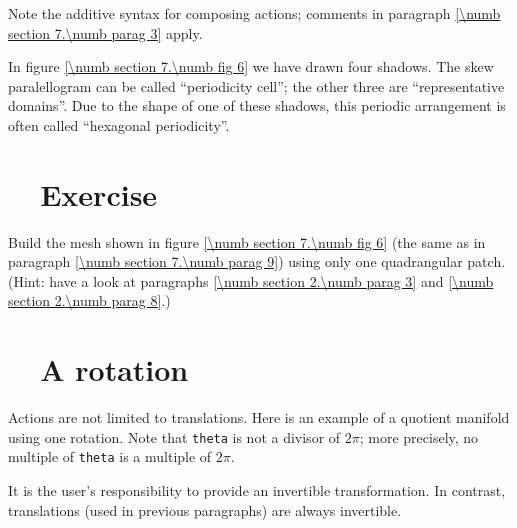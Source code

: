 Note the additive syntax for composing actions; comments in paragraph
\ref{\numb section 7.\numb parag 3} apply.

In figure \ref{\numb section 7.\numb fig 6} we have drawn four shadows.
The skew paralellogram can be called ``periodicity cell'';
the other three are ``representative domains''.
Due to the shape of one of these shadows, this periodic arrangement is often called
``hexagonal periodicity''.


\section{~~Exercise}\label{\numb section 7.\numb parag 10}

Build the mesh shown in figure \ref{\numb section 7.\numb fig 6}
(the same as in paragraph \ref{\numb section 7.\numb parag 9}) using only one quadrangular patch.
(Hint: have a look at paragraphs \ref{\numb section 2.\numb parag 3} and
\ref{\numb section 2.\numb parag 8}.)


\section{~~A rotation}\label{\numb section 7.\numb parag 11}

Actions are not limited to translations.
Here is an example of a quotient manifold using one rotation.
Note that {\small\tt theta} is not a divisor of $ 2\pi $;
more precisely, no multiple of {\small\tt theta} is a multiple of $ 2\pi $.

It is the user's responsibility to provide an invertible transformation.
In contrast, translations (used in previous paragraphs) are always invertible.


